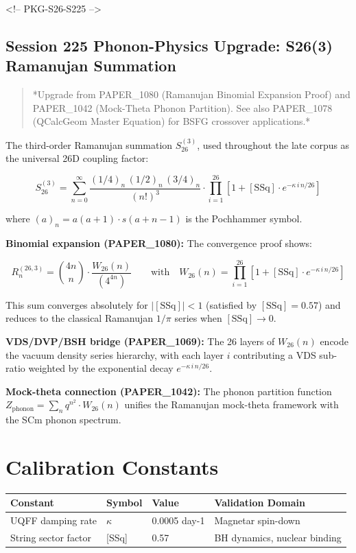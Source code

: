 \documentclass[11pt]{article}
\begin{document}
<!-- PKG-S26-S225 -->

\subsection*{Session 225 Phonon-Physics Upgrade: S26(3) Ramanujan Summation}

\begin{quote}
*Upgrade from PAPER\_1080 (Ramanujan Binomial Expansion Proof) and
PAPER\_1042 (Mock-Theta Phonon Partition).  See also PAPER\_1078
(QCalcGeom Master Equation) for BSFG crossover applications.*
\end{quote}

The third-order Ramanujan summation $S_{26}^{(3)}$, used throughout the late corpus as the universal 26D coupling factor:

$$S_{26}^{(3)} = \sum_{n=0}^{\infty} \frac{(1/4)_n\,(1/2)_n\,(3/4)_n}{(n!)^3} \cdot \prod_{i=1}^{26}\left[1 + [\text{SSq}]\cdot e^{-\kappa\,i\,n/26}\right]$$

where $(a)_n = a(a+1)\cdot s(a+n-1)$ is the Pochhammer symbol.

\textbf{Binomial expansion (PAPER\_1080):} The convergence proof shows:

$$R_n^{(26,3)} = \binom{4n}{n} \cdot \frac{W_{26}(n)}{(4^{4n})} \qquad \text{with}\quad W_{26}(n) = \prod_{i=1}^{26}\left[1 + [\text{SSq}]\cdot e^{-\kappa\,i\,n/26}\right]$$

This sum converges absolutely for $|[\text{SSq}]| < 1$ (satisfied by $[\text{SSq}] = 0.57$) and reduces to the classical Ramanujan $1/\pi$ series when $[\text{SSq}] \to 0$.

\textbf{VDS/DVP/BSH bridge (PAPER\_1069):} The 26 layers of $W_{26}(n)$ encode the vacuum density series hierarchy, with each layer $i$ contributing a VDS sub-ratio weighted by the exponential decay $e^{-\kappa\,i\,n/26}$.

\textbf{Mock-theta connection (PAPER\_1042):} The phonon partition function $Z_{\text{phonon}} = \sum_n q^{n^2} \cdot W_{26}(n)$ unifies the Ramanujan mock-theta framework with the SCm phonon spectrum.

\section*{Calibration Constants}

\begin{center}
\begin{longtable}{llll}
\toprule
Constant & Symbol & Value & Validation Domain \tabularnewline
\midrule
\endhead
UQFF damping rate & $\kappa$ & 0.0005 day-1 & Magnetar spin-down \tabularnewline
String sector factor & {}[SSq] & 0.57 & BH dynamics, nuclear binding \tabularnewline
\bottomrule
\end{longtable}
\end{center}
\end{document}
